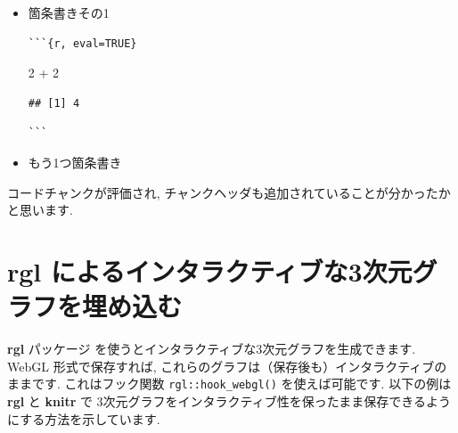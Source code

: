 \documentclass[
  11pt,
  lualatex,ja=standard,jafont=noto]{bxjsreport}
\newenvironment{Shaded}{\begin{snugshade}}{\end{snugshade}}
\newcommand{\DecValTok}[1]{\textcolor[rgb]{0.00,0.00,0.81}{#1}}
\newcommand{\SpecialCharTok}[1]{\textcolor[rgb]{0.00,0.00,0.00}{#1}}
\renewenvironment{quote}{\def\FrameCommand{{\color{quotebarcolor}{\vrule width 3pt}}\hspace{10pt}}\MakeFramed{\advance\hsize-\width\FrameRestore}}{\endMakeFramed}
\begin{document}
\begin{quote}
\begin{itemize}
\item
  箇条書きその1

\begin{verbatim}
```{r, eval=TRUE}
\end{verbatim}

\begin{Shaded}
\begin{Highlighting}[]
\DecValTok{2} \SpecialCharTok{+} \DecValTok{2}
\end{Highlighting}
\end{Shaded}

\begin{verbatim}
## [1] 4
\end{verbatim}

\begin{verbatim}
```
\end{verbatim}
\item
  もう1つ箇条書き
\end{itemize}
\end{quote}

コードチャンクが評価され, チャンクヘッダも追加されていることが分かったかと思います.

\hypertarget{rgl-3d}{%
\section{rgl によるインタラクティブな3次元グラフを埋め込む}\label{rgl-3d}}

\textbf{rgl} パッケージ \autocite{R-rgl} を使うとインタラクティブな3次元グラフを生成できます. WebGL 形式で保存すれば, これらのグラフは（保存後も）インタラクティブのままです. これはフック関数 \texttt{rgl::hook\_webgl()} を使えば可能です. 以下の例は \textbf{rgl} と \textbf{knitr} で 3次元グラフをインタラクティブ性を保ったまま保存できるようにする方法を示しています.
\end{document}
